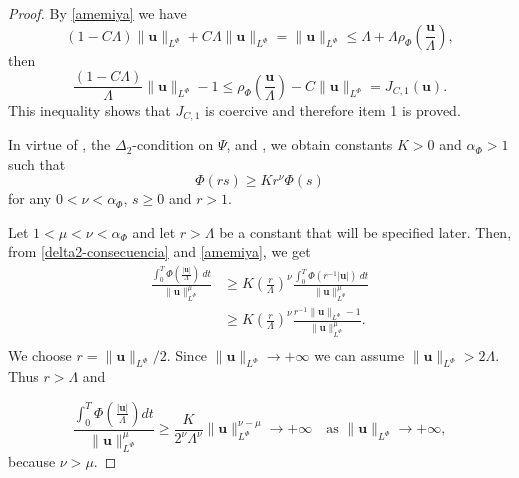 \documentclass[twoside]{article}
\theoremstyle{remark}
\newcommand{\orlnor}{\|_{L^{\Phi}}}
\renewcommand{\b}[1]{\boldsymbol{#1}}
\renewcommand{\leq}{\leqslant}
\begin{document}
\begin{proof} By \eqref{amemiya} we have
\[(1-C\Lambda)\|\b{u}\orlnor+C\Lambda\|\b{u}\orlnor=\|\b{u}\orlnor\leq \Lambda +\Lambda \rho_{\Phi}\left(\frac{\b{u}}{\Lambda}\right),\]
then
\[\frac{(1-C\Lambda)}{\Lambda}\|\b{u}\orlnor-1\leq \rho_{\Phi}\left(\frac{\b{u}}{\Lambda}\right)- C\|\b{u}\orlnor=J_{C,1}(\b{u}).\]
This inequality shows that $J_{C,1}$ is coercive and therefore item 1 is proved.  

In virtue of \cite[Eq. (2.8)]{AGMS}, the $\Delta_2$-condition on $\Psi$, \cite[Thm. 11.7]{M} and \cite[Cor. 11.6]{M}, we obtain constants $K>0$ and $\alpha_{\Phi}>1$ such that 
\begin{equation}\label{delta2-consecuencia}
\Phi(r s)\geq Kr^{\nu}\Phi(s)
\end{equation}
for any $0<\nu<\alpha_{\Phi}$,  $s\geq 0$ and $r>1$.

Let $1<\mu<\nu<\alpha_{\Phi}$ and let $r>\Lambda$ be a constant that will be specified later.  
Then, from \eqref{delta2-consecuencia} and \eqref{amemiya}, we get
\[
\begin{split}
\frac{\int_0^T \Phi\left(\frac{|\b{u}|}{\Lambda}\right)\ dt}{\|\b{u}\orlnor^{\mu}}
&\geq
K \left(\frac{r}{\Lambda}\right)^{\nu}\frac{\int_0^T \Phi(r^{-1}|\b{u}|)\ dt}{\|\b{u}\orlnor^{\mu}}\\
&\geq
K \left(\frac{r}{\Lambda}\right)^{\nu}\frac{r^{-1}\|\b{u}\orlnor-1}{\|\b{u}\orlnor^{\mu}}.\\
\end{split}
\]
We choose $r=\|\b{u}\orlnor/2$. Since $\|\b{u}\orlnor\to+\infty$   we can assume $\|\b{u}\orlnor>2\Lambda$.  Thus $r>\Lambda$ and 

\[
\frac{\int_0^T \Phi\left(\frac{|\b{u}|}{\Lambda}\right) dt}{\|\b{u}\orlnor^{\mu}}\geq
\frac{K}{2^{\nu}\Lambda^{\nu}} \|\b{u}\orlnor^{\nu-\mu}\to +\infty\quad\text{as }\|\b{u}\orlnor\to+\infty,
\]
because $\nu>\mu$.


\end{proof}
\end{document}
